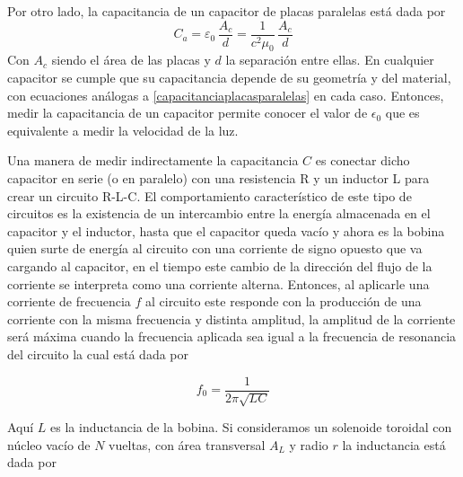 Por otro lado, la capacitancia de un capacitor de placas paralelas está dada por
\begin{equation} \label{capacitanciaplacasparalelas}
C_a=\varepsilon_0\,\frac{A_c}{d}=\frac{1}{c^{2}\mu_0}\,\frac{A_c}{d}
\end{equation}
Con $A_c$ siendo el área de las placas y $d$ la separación entre ellas. En cualquier capacitor se cumple que su capacitancia depende de su geometría y del material, con ecuaciones análogas a \eqref{capacitanciaplacasparalelas} en cada caso. Entonces, medir la capacitancia de un capacitor permite conocer el valor de $\epsilon_0$ que es equivalente a medir la velocidad de la luz. 

Una manera de medir indirectamente la capacitancia $C$ es conectar dicho capacitor en serie (o en paralelo) con una resistencia R y un inductor L para crear un circuito R-L-C. %
El comportamiento característico de este tipo de circuitos es la existencia de un intercambio entre la energía almacenada en el capacitor y el inductor, hasta que el capacitor queda vacío y ahora es la bobina quien surte de energía al circuito con una corriente de signo opuesto que va cargando al capacitor, en el tiempo este cambio de la dirección del flujo de la corriente se interpreta como una corriente alterna. Entonces, al aplicarle una corriente de frecuencia $f$ al circuito este responde con la producción de una corriente con la misma frecuencia y distinta amplitud, la amplitud de la corriente será máxima cuando la frecuencia aplicada sea igual a la frecuencia de resonancia del circuito la cual está dada por 

\begin{equation} \label{frecuenciaResonancia}
f_0=\frac{1}{2\pi\sqrt{LC}}
\end{equation}

Aquí $L$ es la inductancia de la bobina. Si consideramos un solenoide toroidal con núcleo vacío de $N$ vueltas, con área transversal $A_L$ y radio $r$ la inductancia está dada por

